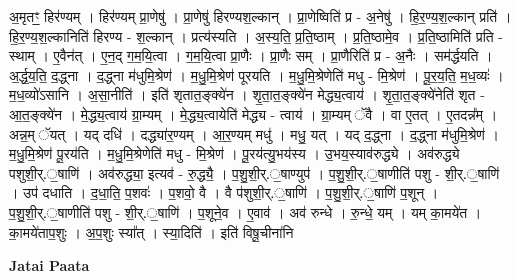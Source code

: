 \documentclass[17pt]{extarticle}
\begin{document}
अ॒मृतꣳ॒॒ हिर॑ण्यम् । हिर॑ण्यम् प्रा॒णेषु॑ । प्रा॒णेषु॑ हिरण्यश॒ल्कान् । प्रा॒णेष्विति॑ प्र - अ॒नेषु॑ । हि॒र॒ण्य॒श॒ल्कान् प्रति॑ । हि॒र॒ण्य॒श॒ल्कानिति॑ हिरण्य - श॒ल्कान् । प्रत्य॑स्यति । अ॒स्य॒ति॒ प्र॒ति॒ष्ठाम् । प्र॒ति॒ष्ठामे॒व । प्र॒ति॒ष्ठामिति॑ प्रति - स्थाम् । ए॒वैन॑त् । ए॒न॒द् ग॒म॒यि॒त्वा । ग॒म॒यि॒त्वा प्रा॒णैः । प्रा॒णैः सम् । प्रा॒णैरिति॑ प्र - अ॒नैः । सम॑र्द्धयति । अ॒र्द्ध॒य॒ति॒ द॒द्ध्ना । द॒द्ध्ना म॑धुमि॒श्रेण॑ । म॒धु॒मि॒श्रेण॑ पूरयति । म॒धु॒मि॒श्रेणेति॑ मधु - मि॒श्रेण॑ । पू॒र॒य॒ति॒ म॒ध॒व्यः॑ । म॒ध॒व्यो॑ऽसानि । अ॒सा॒नीति॑ । इति॑ शृतात॒ङ्क्ये॑न । शृ॒ता॒त॒ङ्क्ये॑न मेद्ध्य॒त्वाय॑ । शृ॒ता॒त॒ङ्क्ये॑नेति॑ शृत - आ॒त॒ङ्क्ये॑न । मे॒द्ध्य॒त्वाय॑ ग्रा॒म्यम् । मे॒द्ध्य॒त्वायेति॑ मेद्ध्य - त्वाय॑ । ग्रा॒म्यम् ॅवै । वा ए॒तत् । ए॒तदन्न᳚म् । अन्न॒म् ॅयत् । यद् दधि॑ । दद्ध्या॑र॒ण्यम् । आ॒र॒ण्यम् मधु॑ । मधु॒ यत् । यद् द॒द्ध्ना । द॒द्ध्ना म॑धुमि॒श्रेण॑ । म॒धु॒मि॒श्रेण॑ पू॒रय॑ति । म॒धु॒मि॒श्रेणेति॑ मधु - मि॒श्रेण॑ । पू॒रय॑त्यु॒भय॑स्य । उ॒भय॒स्याव॑रुद्ध्ये । अव॑रुद्ध्ये पशुशी॒र्.॒षाणि॑ । अव॑रुद्ध्या॒ इत्यव॑ - रु॒द्ध्यै॒ । प॒शु॒शी॒र्.॒षाण्युप॑ । प॒शु॒शी॒र्.॒षाणीति॑ पशु - शी॒र्.॒षाणि॑ । उप॑ दधाति । द॒धा॒ति॒ प॒शवः॑ । प॒शवो॒ वै । वै प॑शुशी॒र्.॒षाणि॑ । प॒शु॒शी॒र्.॒षाणि॑ प॒शून् । प॒शु॒शी॒र्.॒षाणीति॑ पशु - शी॒र्.॒षाणि॑ । प॒शूने॒व । ए॒वाव॑ । अव॑ रुन्धे । रु॒न्धे॒ यम् । यम् का॒मये॑त । का॒मये॑ताप॒शुः । अ॒प॒शुः स्या᳚त् । स्या॒दिति॑ । इति॑ विषू॒चीना॑नि \newline

\textbf{Jatai Paata} \newline
\end{document}
